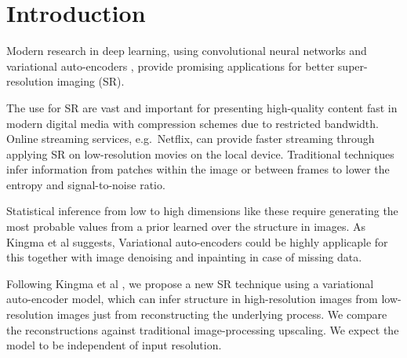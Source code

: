 \section{Introduction}
\label{sec:introduction}
Modern research in deep learning, using convolutional neural networks \cite{Dong15} and variational auto-encoders \cite{Kingma2013, Johnson16}, provide promising applications for better super-resolution imaging (SR).  

The use for SR are vast and important for presenting high-quality content fast in modern digital media with compression schemes due to restricted bandwidth. Online streaming services, e.g.\ Netflix, can provide faster streaming through applying SR on low-resolution movies on the local device. Traditional techniques infer information from patches within the image or between frames to lower the entropy and signal-to-noise ratio. 

Statistical inference from low to high dimensions like these require generating the most probable values from a prior learned over the structure in images. As Kingma et al \cite{Kingma2013} suggests, Variational auto-encoders could be highly applicaple for this together with image denoising and inpainting in case of missing data.

Following Kingma et al \cite{Kingma2013}, we propose a new SR technique using a variational auto-encoder model, which can infer structure in high-resolution images from low-resolution images just from reconstructing the underlying process. We compare the reconstructions against traditional image-processing upscaling. We expect the model to be independent of input resolution.

